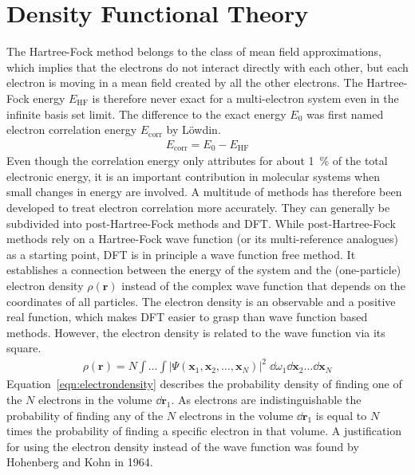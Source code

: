 \section{Density Functional Theory}
\label{sec:dft}

The Hartree-Fock method belongs to the class of mean field approximations,
which implies that the electrons do not interact directly with each other, but
each electron is moving in a mean field created by all the other electrons. The
Hartree-Fock energy $E_\text{HF}$ is therefore never exact for a multi-electron
system even in the infinite basis set limit. The difference to the exact energy
$E_0$ was first named electron correlation energy $E_\text{corr}$ by
L\"owdin\autocite{Lowdin_CorrelationProblemManyElectron_1958}.
%
\begin{align}
    E_\text{corr} = E_0 - E_\text{HF}
\end{align}
%
Even though the correlation energy only attributes for about \SI{1}{\percent}
of the total electronic energy, it is an important contribution in molecular
systems when small changes in energy are involved. A multitude of methods has
therefore been developed to treat electron correlation more accurately. They
can generally be subdivided into post-Hartree-Fock methods  and \ac{DFT}. While
post-Hartree-Fock methods rely on a Hartree-Fock wave function (or its
multi-reference analogues) as a starting point, \ac{DFT} is in principle a wave
function free method. It establishes a connection between the energy of the
system and the (one-particle) electron density $\rho({\mathbf r})$ instead of
the complex wave function that depends on the coordinates of all particles. The
electron density is an observable and a positive real function, which makes
\ac{DFT} easier to grasp than wave function based methods. However, the
electron density is related to the wave function via its square. 
%
\begin{align}
    \rho(\mathbf{r})=N\int\dots\int|\Psi(\mathbf{x}_1,\mathbf{x}_2,\dots,\mathbf{x}_N)|^2\;\dd\omega_1\dd\mathbf{x}_2\dots\dd\mathbf{x}_N\label{eqn:electrondensity}
\end{align}
%
Equation~\eqref{eqn:electrondensity} describes the probability density of
finding one of the $N$ electrons in the volume $\dd \mathbf{r}_1$. As electrons
are indistinguishable the probability of finding any of the $N$ electrons in
the volume $\dd\mathbf{r}_1$ is equal to $N$ times the probability of finding a
specific electron in that volume.  A justification for using the electron
density instead of the wave function was found by Hohenberg and Kohn in
1964.\autocite{Hohenberg_InhomogeneousElectronGas_1964}

